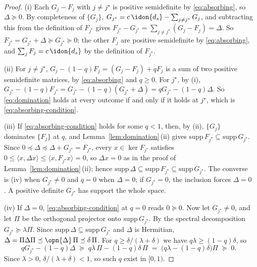 \begin{proof}
(i) Each $G_j-F_j$ with $j\neq j^{\star}$ is positive semidefinite by
\eqref{eq:absorbing}, so $\Delta\succeq0$. By completeness of $\{G_j\}$,
$G_{j^{\star}}=c\,\idon{d_s}-\sum_{j\neq j^{\star}}G_j$, and subtracting this
from the definition of $F_{j^{\star}}$ gives
$F_{j^{\star}}-G_{j^{\star}}=\sum_{j\neq j^{\star}}(G_j-F_j)=\Delta$. So
$F_{j^{\star}}=G_{j^{\star}}+\Delta\succeq G_{j^{\star}}\succeq0$; the other
$F_j$ are positive semidefinite by \eqref{eq:absorbing}, and
$\sum_jF_j=c\,\idon{d_s}$ by the definition of $F_{j^{\star}}$.

(ii) For $j\neq j^{\star}$,
$G_j-(1-q)F_j=(G_j-F_j)+qF_j$ is a sum of two positive semidefinite
matrices, by \eqref{eq:absorbing} and $q\ge0$. For $j^{\star}$, by (i),
$G_{j^{\star}}-(1-q)F_{j^{\star}}=G_{j^{\star}}-(1-q)(G_{j^{\star}}+\Delta)
=qG_{j^{\star}}-(1-q)\Delta$. So \eqref{eq:domination} holds at every outcome
if and only if it holds at $j^{\star}$, which is
\eqref{eq:absorbing-condition}.

(iii) If \eqref{eq:absorbing-condition} holds for some $q<1$, then, by (ii),
$\{G_j\}$ dominates $\{F_j\}$ at $q$, and
Lemma~\ref{lem:domination}\,(ii) gives
$\mathrm{supp}\,F_{j^{\star}}\subseteq\mathrm{supp}\,G_{j^{\star}}$. Since
$0\preceq\Delta\preceq\Delta+G_{j^{\star}}=F_{j^{\star}}$, every
$x\in\ker F_{j^{\star}}$ satisfies $0\le\langle x,\Delta x\rangle\le
\langle x,F_{j^{\star}}x\rangle=0$, so $\Delta x=0$ as in the proof of
Lemma~\ref{lem:domination}\,(ii); hence
$\mathrm{supp}\,\Delta\subseteq\mathrm{supp}\,F_{j^{\star}}\subseteq
\mathrm{supp}\,G_{j^{\star}}$. The converse is (iv) when $G_{j^{\star}}\neq0$
and $q=0$ when $\Delta=0$; if $G_{j^{\star}}=0$, the inclusion forces
$\Delta=0$. A positive definite $G_{j^{\star}}$ has support the whole space.

(iv) If $\Delta=0$, \eqref{eq:absorbing-condition} at $q=0$ reads $0\succeq0$.
Now let $G_{j^{\star}}\neq0$, and let $\Pi$ be the orthogonal projector onto
$\mathrm{supp}\,G_{j^{\star}}$. By the spectral decomposition
$G_{j^{\star}}\succeq\lambda\Pi$. Since $\mathrm{supp}\,\Delta\subseteq
\mathrm{supp}\,G_{j^{\star}}$ and $\Delta$ is Hermitian,
$\Delta=\Pi\Delta\Pi\preceq\opn{\Delta}\,\Pi\preceq\delta\,\Pi$. For
$q\ge\delta/(\lambda+\delta)$ we have $q\lambda\ge(1-q)\delta$, so
\begin{equation*}
  qG_{j^{\star}}-(1-q)\Delta\;\succeq\;q\lambda\,\Pi-(1-q)\delta\,\Pi
  \;=\;\big(q\lambda-(1-q)\delta\big)\Pi\;\succeq\;0 .
\end{equation*}
Since $\lambda>0$, $\delta/(\lambda+\delta)<1$, so such $q$ exist in
$[0,1)$.
\end{proof}
